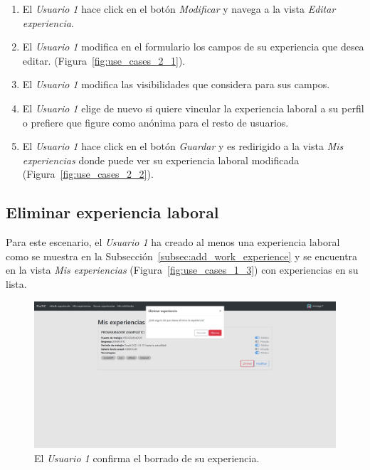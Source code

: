 \documentclass[a4paper, 12pt]{book}
\begin{document}
    \begin{enumerate}
        \item El \emph{Usuario 1} hace click en el botón \emph{Modificar} y navega a la vista \emph{Editar experiencia}.
        \item El \emph{Usuario 1} modifica en el formulario los campos de su experiencia que desea editar.
        (Figura~\ref{fig:use_cases_2_1}).
        \item El \emph{Usuario 1} modifica las visibilidades que considera para sus campos.
        \item El \emph{Usuario 1} elige de nuevo si quiere vincular la experiencia laboral a su perfil o prefiere
        que figure como anónima para el resto de usuarios.
        \item El \emph{Usuario 1} hace click en el botón \emph{Guardar} y es redirigido a la vista
        \emph{Mis experiencias} donde puede ver su experiencia laboral modificada (Figura~\ref{fig:use_cases_2_2}).
    \end{enumerate}

    \subsection{Eliminar experiencia laboral}
    \label{subsec:delete_work_experience}
    Para este escenario, el \emph{Usuario 1} ha creado al menos una experiencia laboral como se muestra en la Subsección~\ref{subsec:add_work_experience}
    y se encuentra en la vista \emph{Mis experiencias} (Figura~\ref{fig:use_cases_1_3}) con experiencias en su lista.

    \begin{figure}
        \centering
        \includegraphics[width=15cm, keepaspectratio]{img/3.1.png}
        \caption{El \emph{Usuario 1} confirma el borrado de su experiencia.}
        \label{fig:use_cases_3_1}
    \end{figure}
\end{document}
